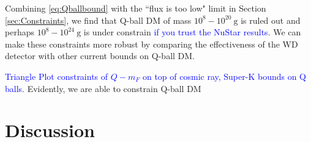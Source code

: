 \documentclass[twocolumn,showpacs,preprintnumbers,amsmath,amssymb,prd]{revtex4}
\begin{document}
Combining \eqref{eq:Qballbound} with the ``flux is too low" limit in Section \ref{sec:Constraints}, we find that Q-ball DM of mass $10^{8} - 10^{20} ~\text{g}$ is ruled out and perhaps $10^{8} - 10^{24} ~\text{g}$ is under constrain \textcolor{blue}{if you trust the NuStar results}. We can make these constraints more robust by comparing the effectiveness of the WD detector with other current bounds on Q-ball DM. 

\textcolor{blue}{Triangle Plot constraints of $Q - m_F$ on top of cosmic ray, Super-K bounds on Q balls}.
Evidently, we are able to constrain Q-ball DM 

\section{Discussion}
\label{sec:discussion}
\end{document}

